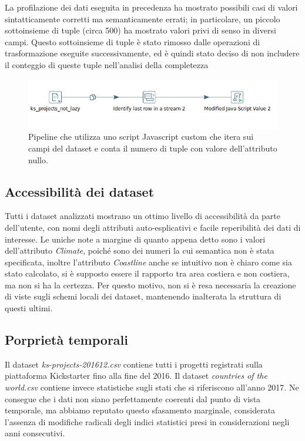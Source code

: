 La profilazione dei dati eseguita in precedenza ha mostrato possibili casi di valori sintatticamente corretti ma semanticamente errati; in particolare, un piccolo sottoinsieme di tuple (circa 500) ha mostrato valori privi di senso in diversi campi. Questo sottoinsieme di tuple è stato rimosso dalle operazioni di trasformazione eseguite successivamente, ed è quindi stato deciso di non includere il conteggio di queste tuple nell'analisi della completezza

\begin{figure}[h!]
	\centering
	\includegraphics[width=0.7\linewidth]{images/DQ_completezza}
	\caption{Pipeline che utilizza uno script Javascript custom che itera sui campi del dataset e conta il numero di tuple con valore dell'attributo nullo.}
	\label{fig:dqcompletezza}
\end{figure}


\subsection{Accessibilità dei dataset}
Tutti i dataset analizzati mostrano un ottimo livello di accessibilità da parte dell'utente, con nomi degli attributi auto-esplicativi e facile reperibilità dei dati di interesse. 
Le uniche note a margine di quanto appena detto sono i valori dell'attributo \textit{Climate}, poiché sono dei numeri la cui semantica non è stata specificata, inoltre l'attributo \textit{Coastline} anche se intuitivo non è chiaro come sia stato calcolato, si è supposto essere il rapporto tra area costiera e non costiera, ma non si ha la certezza.
Per questo motivo, non si è resa necessaria la creazione di viste sugli schemi locali dei dataset, mantenendo inalterata la struttura di questi ultimi.

\subsection{Porprietà temporali}
\label{subsec:temporali}
Il dataset \textit{ks-projects-201612.csv} contiene tutti i progetti registrati sulla piattaforma Kickstarter fino alla fine del 2016. Il dataset \textit{countries of the world.csv} contiene invece statistiche sugli stati che si riferiscono all'anno 2017. Ne consegue che i dati non siano perfettamente coerenti dal punto di vista temporale, ma abbiamo reputato questo sfasamento marginale, considerata l'assenza di modifiche radicali degli indici statistici presi in considerazioni negli anni consecutivi.

